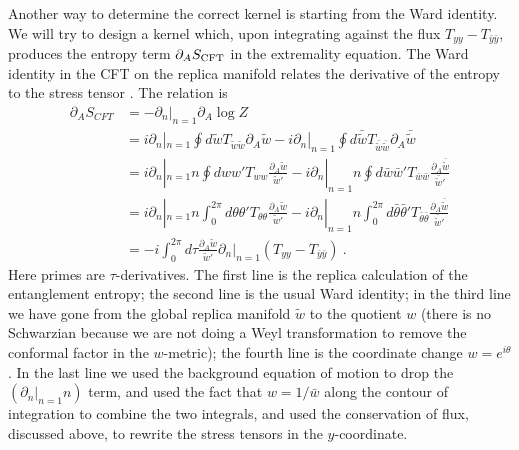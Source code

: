 \documentclass[12pt]{article}
\newcommand{\p}{\partial}
\renewcommand{\p}{\partial}
\numberwithin{equation}{section}
\def\p{{\phi}}
\renewcommand{\p}{\partial}
\newcommand{\by}{\bar{y}}
\begin{document}
\begin{spacing}{1.1}
Another way to determine the correct kernel is starting from the Ward identity. We will try to design a kernel which, upon integrating against the flux $T_{yy} - T_{\by \by}$, produces the entropy term $\p_A S_{\rm CFT}$ in the extremality equation. The Ward identity in the CFT on the replica manifold relates the derivative of the entropy to the stress tensor \cite{Calabrese:2004eu, Calabrese:2009qy}. The relation is 
\newcommand{\btheta}{\bar{\theta}}
\begin{align}\label{Wardderivation}
\p_A S_{CFT} &=  -\p_n|_{n=1} \p_A \log Z \\
\label{eq:ward}&= i \p_n|_{n=1} \oint d\tilde{w} T_{\tilde w \tilde w}\p_A \tilde{w} - i \p_n|_{n=1} \oint d\bar{\tilde{w}} T_{\bar{\tilde{w}} \bar{\tilde{w}}} \p_A \bar{\tilde{w}}  \\
\label{eq:ward2}&= i \p_n|_{n=1} n \oint dw w' T_{ww} \frac{\p_A \tilde{w}}{\tilde{w}'} - i \p_n|_{n=1} n \oint d\bar{w} \bar{w}' T_{\bar{w} \bar{w}} \frac{\p_A \bar{\tilde{w}}}{\bar{\tilde{w}}'} \\
&= i \p_n|_{n=1} n \int_0^{2\pi} d\theta \theta' T_{\theta\theta} \frac{\p_A \tilde{w}}{\tilde{w}'}  - i \p_n|_{n=1} n \int_0^{2\pi} d\btheta \btheta' T_{\btheta\btheta} 
\frac{\p_A \bar{\tilde{w}}}{\bar{\tilde{w}}'}\\
&= - i \int_0^{2\pi}d\tau  \frac{\p_A \tilde{w}}{\tilde{w}'} \p_n|_{n=1}(T_{yy} - T_{\by \by} )  \ .
\end{align}
Here primes are $\tau$-derivatives. The first line is the replica calculation of the entanglement entropy; the second line is the usual Ward identity; in the third line we have gone from the global replica manifold $\tilde{w}$ to the quotient $w$ (there is no Schwarzian because we are not doing a Weyl transformation to remove the conformal factor in the $w$-metric); the fourth line is the coordinate change $w=e^{i\theta}$. In the last line we used the background equation of motion to drop the $(\p_n|_{n=1} n)$ term, and used the fact that $w = 1/\bar{w}$ along the contour of integration to combine the two integrals, and used the conservation of flux, discussed above, to rewrite the stress tensors in the $y$-coordinate.


\end{spacing}
\end{document}
